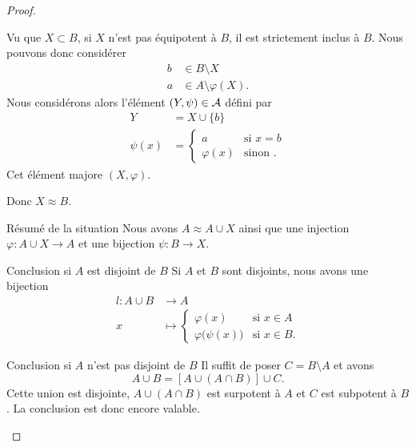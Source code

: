 \begin{proof}
\begin{subproof}
            Vu que \( X\subset B\), si \( X\) n'est pas équipotent à \( B\), il est strictement inclus à \( B\). Nous pouvons donc considérer
            \begin{subequations}
                \begin{align}
                    b&\in B\setminus X\\
                    a&\in A\setminus \varphi(X).
                \end{align}
            \end{subequations}
            Nous considérons alors l'élément \( (Y,\psi)\in \mathcal{A}\) défini par
            \begin{subequations}
                \begin{align}
                    Y&=X\cup\{ b \}\\
                    \psi(x)&=\begin{cases}
                        a    &   \text{si } x=b\\
                        \varphi(x)    &    \text{sinon }.
                    \end{cases}
                \end{align}
            \end{subequations}
            Cet élément majore \( (X,\varphi)\).

            Donc \( X\approx B\).
        \item[Résumé de la situation]
            Nous avons \( A\approx A\cup X\) ainsi que une injection \( \varphi\colon A\cup X\to A\) et une bijection \( \psi\colon B\to X\).
        \item[Conclusion si \( A\) est disjoint de \( B\)]
            Si \( A\) et \( B\) sont disjoints, nous avons une bijection
            \begin{equation}
                \begin{aligned}
                    l\colon A\cup B&\to A \\
                    x&\mapsto \begin{cases}
                        \varphi(x)    &   \text{si }  x\in A\\
                        \varphi\big( \psi(x) \big)    &    \text{si } x\in B.
                    \end{cases}
                \end{aligned}
            \end{equation}
        \item[Conclusion si \( A\) n'est pas disjoint de \( B\)]
            Il suffit de poser \( C=B\setminus A\) et avons
            \begin{equation}
                A\cup B=[A\cup (A\cap B)]\cup C.
            \end{equation}
            Cette union est disjointe, \( A\cup(A\cap B)\) est surpotent à \( A\) et \( C\) est subpotent à $B$. La conclusion est donc encore valable.
    \end{subproof}
\end{proof}

